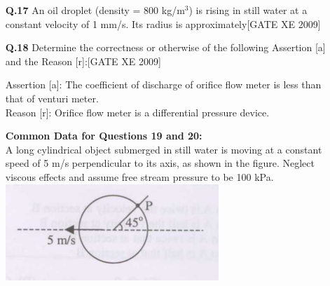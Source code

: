 \documentclass[journal,12pt,onecolumn]{IEEEtran}
\theoremstyle{remark}
\begin{document}
\begin{enumerate}
\begin{enumerate}
\vspace{0.3cm}

\item[\textbf{Q.17}] An oil droplet (density = 800 kg/m$^3$) is rising in still water at a constant velocity of 1 mm/s. Its radius is approximately\hfill[GATE XE 2009]

\begin{enumerate}
\end{enumerate}

\vspace{0.3cm}

\item[\textbf{Q.18}] Determine the correctness or otherwise of the following Assertion [a] and the Reason [r]:\hfill[GATE XE 2009]

Assertion [a]: The coefficient of discharge of orifice flow meter is less than that of venturi meter.\\
Reason [r]: Orifice flow meter is a differential pressure device.

\begin{enumerate}
\end{enumerate}

\vspace{0.5cm}

\textbf{Common Data for Questions 19 and 20:}\\
A long cylindrical object submerged in still water is moving at a constant speed of 5 m/s perpendicular to its axis, as shown in the figure. Neglect viscous effects and assume free stream pressure to be 100 kPa.\\
  
    \includegraphics[width=0.5\columnwidth]{figs/fig4.png}
    





\end{enumerate}
\end{enumerate}
\end{document}
